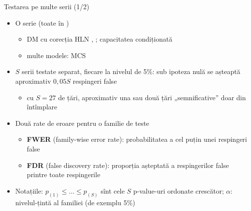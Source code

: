 \begin{frame}{Testarea pe multe serii (1/2)}
\itemsize{\small}
\begin{itemize}
    \item O serie (toate în )
    \begin{itemize}
        \item DM cu corecția HLN , ; capacitatea condiționată 
        \item multe modele: MCS 
    \end{itemize}
    \item $S$ serii testate separat, fiecare la nivelul de 5\%: sub ipoteza nulă se așteaptă aproximativ $0{,}05S$ respingeri false
    \begin{itemize}
        \item cu $S = 27$ de țări, aproximativ una sau două țări „semnificative” doar din întîmplare
    \end{itemize}
    \item Două rate de eroare pentru o familie de teste
    \begin{itemize}
        \item \textbf{FWER} (family-wise error rate): probabilitatea a cel puțin unei respingeri false
        \item \textbf{FDR} (false discovery rate): proporția așteptată a respingerilor false printre toate respingerile
    \end{itemize}
    \item Notațiile: $p_{(1)} \le \dots \le p_{(S)}$ sînt cele $S$ p-value-uri ordonate crescător; $\alpha$: nivelul-țintă al familiei (de exemplu 5\%)
\end{itemize}
\end{frame}

